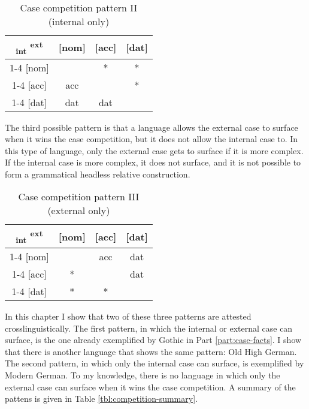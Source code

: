 \begin{table}[H]
  \center
  \caption{Case competition pattern II (internal only)}
  \begin{tabular}{c|c|c|c}
    \toprule
    \textsubscript{\ac{int}} \textsuperscript{\ac{ext}}
           & [\ac{nom}]
           & [\ac{acc}]
           & [\ac{dat}]
           \\ \cmidrule{1-4}
       [\ac{nom}]
           &
           & *
           & *
           \\ \cmidrule{1-4}
       [\ac{acc}]
           & \ac{acc}
           &
           & *
           \\ \cmidrule{1-4}
       [\ac{dat}]
           & \ac{dat}
           & \ac{dat}
           &
           \\
     \bottomrule
  \end{tabular}
    \label{tbl:case-competition-pattern-ii}
\end{table}

The third possible pattern is that a language allows the external case to surface when it wins the case competition, but it does not allow the internal case to. In this type of language, only the external case gets to surface if it is more complex. If the internal case is more complex, it does not surface, and it is not possible to form a grammatical headless relative construction.

\begin{table}[H]
  \center
  \caption{Case competition pattern III (external only)}
  \begin{tabular}{c|c|c|c}
    \toprule
    \textsubscript{\ac{int}} \textsuperscript{\ac{ext}}
           & [\ac{nom}]
           & [\ac{acc}]
           & [\ac{dat}]
           \\ \cmidrule{1-4}
       [\ac{nom}]
           &
           & \ac{acc}
           & \ac{dat}
           \\ \cmidrule{1-4}
       [\ac{acc}]
           & *
           &
           & \ac{dat}
           \\ \cmidrule{1-4}
       [\ac{dat}]
           & *
           & *
           &
           \\
     \bottomrule
  \end{tabular}
    \label{tbl:case-competition-pattern-iii}
\end{table}

In this chapter I show that two of these three patterns are attested crosslinguistically. The first pattern, in which the internal or external case can surface, is the one already exemplified by Gothic in Part \ref{part:case-facts}. I show that there is another language that shows the same pattern: Old High German. The second pattern, in which only the internal case can surface, is exemplified by Modern German. To my knowledge, there is no language in which only the external case can surface when it wins the case competition. A summary of the pattens is given in Table \ref{tbl:competition-summary}.

